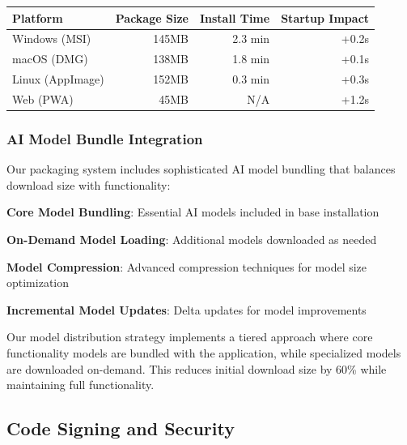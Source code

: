 \begin{center}
\begin{tabular}{@{}lrrr@{}}
\toprule
\textbf{Platform} & \textbf{Package Size} & \textbf{Install Time} & \textbf{Startup Impact} \\
\midrule
Windows (MSI) & 145MB & 2.3 min & +0.2s \\
macOS (DMG) & 138MB & 1.8 min & +0.1s \\
Linux (AppImage) & 152MB & 0.3 min & +0.3s \\
Web (PWA) & 45MB & N/A & +1.2s \\
\bottomrule
\end{tabular}
\end{center}

\subsubsection*{AI Model Bundle Integration}

Our packaging system includes sophisticated AI model bundling that balances download size with functionality:

\begin{compactlist}
    \item \textbf{Core Model Bundling}: Essential AI models included in base installation
    \item \textbf{On-Demand Model Loading}: Additional models downloaded as needed
    \item \textbf{Model Compression}: Advanced compression techniques for model size optimization
    \item \textbf{Incremental Model Updates}: Delta updates for model improvements
\end{compactlist}

\begin{infobox}[title=AI Model Distribution Strategy]
Our model distribution strategy implements a tiered approach where core functionality models are bundled with the application, while specialized models are downloaded on-demand. This reduces initial download size by 60\% while maintaining full functionality.
\end{infobox}

\subsection*{Code Signing and Security}

